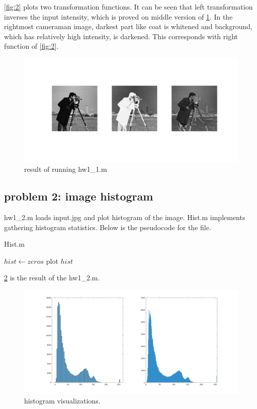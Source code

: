 \documentclass{bmvc2k}
\begin{document}
\figurename{\ref{fig:2}} plots two transformation functions. It can be seen that left transformation
inverses the input intensity, which is proved on middle version of \figurename{\ref{fig:1}}.
In the rightmost cameraman image, darkest part like coat is whitened and background, which has relatively
high intensity, is darkened. This corresponds with right function of \figurename{\ref{fig:2}}.  

\begin{figure}[h]
    \centering
    \includegraphics[scale=0.25]{hw1_1}
    \caption{result of running hw1\_1.m}
    \label{fig:1}
\end{figure}

\subsection*{problem 2: image histogram}

hw1\_2.m loads input.jpg and plot histogram of the image.
Hist.m implements gathering histogram statistics.
Below is the pseudocode for the file.

\begin{algorithm}
\caption{Hist.m}
$hist \gets zeros$\;
plot $hist$\;
\end{algorithm}

\figurename{\ref{fig:3}} is the result of the hw1\_2.m. 

\begin{figure}[h]
    \centering
    \includegraphics[scale=0.25]{hw1_2}
    \caption{histogram visualizations.}
    \label{fig:3}
\end{figure}
\end{document}
